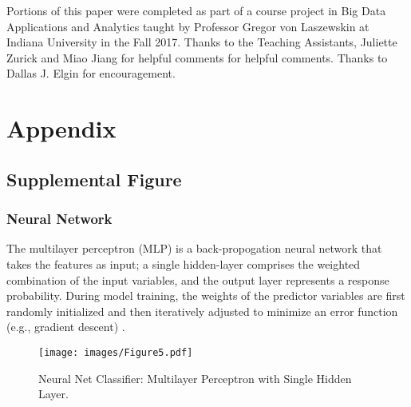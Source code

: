 \documentclass[sigconf]{acmart}
\begin{document}
\begin{acks}

Portions of this paper were completed as part of a course project in Big Data 
Applications and Analytics taught by Professor Gregor von Laszewskin at 
Indiana University in the Fall 2017. Thanks to the Teaching Assistants, 
Juliette Zurick and Miao Jiang for helpful comments for helpful comments. 
Thanks to Dallas J. Elgin for encouragement. 

\end{acks}

 

\appendix

\section{Appendix}

\subsection{Supplemental Figure}

\subsubsection{Neural Network} The multilayer perceptron (MLP) is a 
back-propogation neural network that takes the features as input; a 
single hidden-layer comprises the weighted combination of the input 
variables, and the output layer represents a response probability. 
During model training, the weights of the predictor variables are first 
randomly initialized and then iteratively adjusted to minimize an 
error function (e.g., gradient descent) \cite{brown12}.

\begin{figure}[!ht]
  \centering\texttt{[image: images/Figure5.pdf]}
  \caption{Neural Net Classifier: Multilayer Perceptron with Single Hidden Layer.}
  \label{f:Figure5}
\end{figure}
\end{document}
